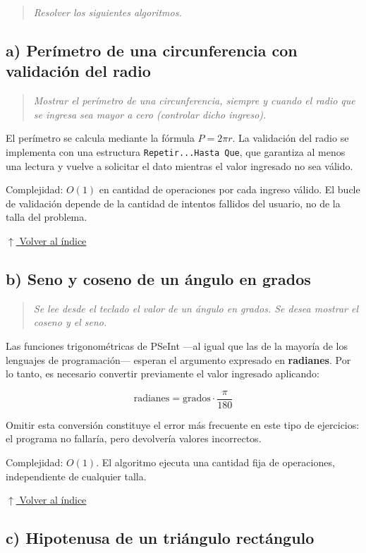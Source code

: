 \documentclass[12pt]{article}
\newcommand{\codigo}[1]{\texttt{\small #1}}
\newcommand{\pseudocodigo}[2]{%
}
\newcommand{\volverindice}{%
    \vspace{1em}%
    \begin{flushright}%
        \hyperlink{indice}{\small $\uparrow$ Volver al índice}%
    \end{flushright}%
}
\newcommand{\enunciado}[1]{%
    \begin{quote}
        \itshape #1
    \end{quote}
}
\begin{document}
\enunciado{Resolver los siguientes algoritmos.}

\subsection{a) Perímetro de una circunferencia con validación del radio}

\enunciado{Mostrar el perímetro de una circunferencia, siempre y cuando el radio que se ingresa sea mayor a cero (controlar dicho ingreso).}

El perímetro se calcula mediante la fórmula $P = 2\pi r$. La validación del radio se implementa con una estructura \codigo{Repetir...Hasta Que}, que garantiza al menos una lectura y vuelve a solicitar el dato mientras el valor ingresado no sea válido.

\pseudocodigo{ej08_a_perimetro_circunferencia}{Perímetro de una circunferencia con validación}

Complejidad: $O(1)$ en cantidad de operaciones por cada ingreso válido. El bucle de validación depende de la cantidad de intentos fallidos del usuario, no de la talla del problema.

\volverindice
\newpage

\subsection{b) Seno y coseno de un ángulo en grados}

\enunciado{Se lee desde el teclado el valor de un ángulo en grados. Se desea mostrar el coseno y el seno.}

Las funciones trigonométricas de PSeInt —al igual que las de la mayoría de los lenguajes de programación— esperan el argumento expresado en \textbf{radianes}. Por lo tanto, es necesario convertir previamente el valor ingresado aplicando:

\[
\text{radianes} = \text{grados} \cdot \frac{\pi}{180}
\]

Omitir esta conversión constituye el error más frecuente en este tipo de ejercicios: el programa no fallaría, pero devolvería valores incorrectos.

\pseudocodigo{ej08_b_seno_coseno}{Seno y coseno de un ángulo ingresado en grados}

Complejidad: $O(1)$. El algoritmo ejecuta una cantidad fija de operaciones, independiente de cualquier talla.

\volverindice
\newpage

\subsection{c) Hipotenusa de un triángulo rectángulo}
\end{document}
